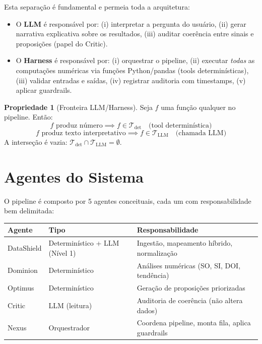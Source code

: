 \documentclass[a4paper, 12pt]{report}
\theoremstyle{definition}
\newtheorem{propriedade}{Propriedade}[chapter]
\theoremstyle{remark}
\begin{document}
Esta separa\c{c}\~ao \'e fundamental e permeia toda a arquitetura:

\begin{itemize}
  \item O \textbf{LLM} \'e respons\'avel por: (i) interpretar a pergunta do
    usu\'ario, (ii) gerar narrativa explicativa sobre os resultados,
    (iii) auditar coer\^encia entre sinais e proposi\c{c}\~oes (papel do Critic).
  \item O \textbf{Harness} \'e respons\'avel por: (i) orquestrar o pipeline,
    (ii) executar \textit{todas} as computa\c{c}\~oes num\'ericas via fun\c{c}\~oes
    Python/pandas (tools determin\'isticas), (iii) validar entradas e sa\'idas,
    (iv) registrar auditoria com timestamps, (v) aplicar guardrails.
\end{itemize}

\begin{propriedade}[Fronteira LLM/Harness]
  Seja $f$ uma fun\c{c}\~ao qualquer no pipeline. Ent\~ao:
  \[
    f \text{ produz n\'umero} \implies f \in \mathcal{T}_{\text{det}}
    \quad \text{(tool determin\'istica)}
  \]
  \[
    f \text{ produz texto interpretativo} \implies f \in \mathcal{T}_{\text{LLM}}
    \quad \text{(chamada LLM)}
  \]
  A interse\c{c}\~ao \'e vazia: $\mathcal{T}_{\text{det}} \cap \mathcal{T}_{\text{LLM}} = \emptyset$.
\end{propriedade}


\section{Agentes do Sistema}

O pipeline \'e composto por 5 agentes conceituais, cada um com
responsabilidade bem delimitada:

\begin{center}
\begin{tabular}{lll}
  \toprule
  \textbf{Agente} & \textbf{Tipo} & \textbf{Responsabilidade} \\
  \midrule
  DataShield & Determin\'istico + LLM (N\'ivel 1) & Ingest\~ao, mapeamento h\'ibrido, normaliza\c{c}\~ao \\
  Dominion & Determin\'istico & An\'alises num\'ericas (SO, SI, DOI, tend\^encia) \\
  Optimus & Determin\'istico & Gera\c{c}\~ao de proposi\c{c}\~oes priorizadas \\
  Critic & LLM (leitura) & Auditoria de coer\^encia (n\~ao altera dados) \\
  Nexus & Orquestrador & Coordena pipeline, monta fila, aplica guardrails \\
  \bottomrule
\end{tabular}
\end{center}
\end{document}
